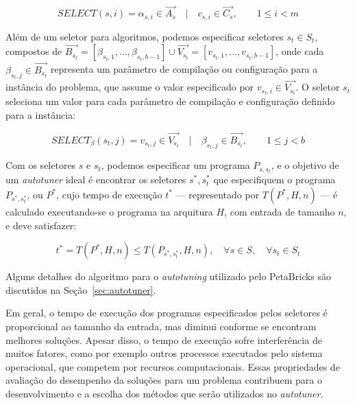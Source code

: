 \documentclass[a4paper, 11pt]{article}
\begin{document}
\begin{equation*}
    SELECT(s, i) = \alpha_{s,i} \in \overrightarrow{A_{s}} \quad | \quad c_{s,i} \in \overrightarrow{C_{s}},
    \quad\quad 1 \leq i < m
\end{equation*}

Além de um seletor para algoritmos, podemos especificar seletores $s_t \in S_t$,
compostos de $\overrightarrow{B_{s_t}} = [\beta_{s_t,1},\dots,\beta_{s_t,b-1}] 
\cup \overrightarrow{V_{s_t}} = [v_{s_t,1},\dots,v_{s_t,b-1}]$,
onde cada $\beta_{s_t,j} \in \overrightarrow{B_{s_t}}$ representa um parâmetro
de compilação ou configuração para a instância do problema, que assume o valor
especificado por $v_{s_t,i} \in \overrightarrow{V_{s_t}}$.
O seletor $s_t$ seleciona um valor para cada parâmetro de compilação e 
configuração definido para a instância:

\begin{equation*}
    SELECT_{\beta}(s_t, j) = v_{s_t,j} \in \overrightarrow{V_{s_t}} \quad | \quad \beta_{s_t,j} \in \overrightarrow{B_{s_t}},
    \quad\quad 1 \leq j < b
\end{equation*}

Com os seletores $s$ e $s_t$, podemos especificar um programa
$P_{s,s_t}$, e o objetivo de um \emph{autotuner} ideal é encontrar
os seletores $s^*,s_{t}^{*}$ que especifiquem o programa $P_{s^*,s_{t}^{*}}$, 
ou $P^*$, cujo tempo de execução $t^*$ --- representado por $T(P^*,H,n)$ --- 
é calculado executando-se o programa na arquitura $H$, com entrada de tamanho
$n$, e deve satisfazer:

\begin{equation*}
    t^* = T(P^*,H,n) \leq T(P_{s^*,s_{t}^{*}},H,n), \quad \forall s \in S, \quad \forall s_t \in S_t
\end{equation*}

Alguns detalhes do algoritmo para o \emph{autotuning} utilizado pelo PetaBricks
são discutidos na Seção~\ref{sec:autotuner}.

Em geral, o tempo de execução dos programas especificados pelos seletores
é proporcional ao tamanho da entrada, mas diminui conforme
se encontram melhores soluções. Apesar disso, o tempo de execução sofre
interferência de muitos fatores, como por exemplo outros processos executados
pelo sistema operacional, que competem por recursos computacionais.
Essas propriedades de avaliação do desempenho da soluções para um problema 
contribuem para o desenvolvimento e a escolha dos métodos
que serão utilizados no \emph{autotuner}.
\end{document}

